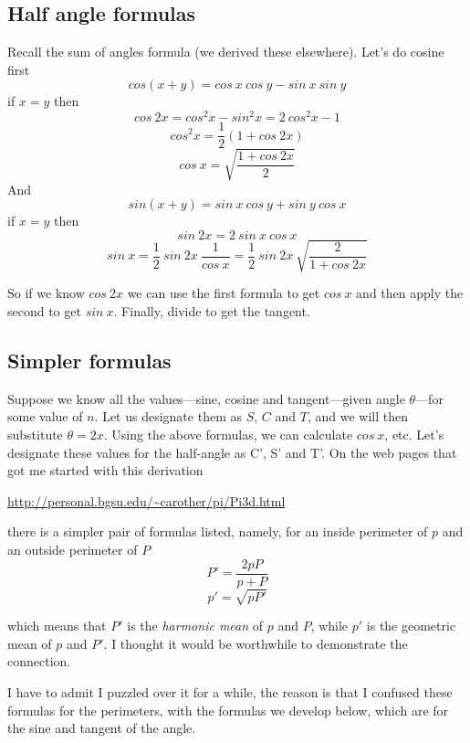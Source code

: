\documentclass[11pt, oneside]{report}   	%
\begin{document}
\subsection*{Half angle formulas}

Recall the sum of angles formula (we derived these elsewhere).  Let's do cosine first
\[ cos(x+y) = cos \ x \ cos \ y -  sin \ x \ sin \ y \]
if $x=y$ then
\[ cos \ 2x = cos^2x - sin^2x = 2 \ cos^2x - 1 \]
\[ cos^2x = \frac{1}{2}(1 + cos\ 2x) \]
\[ cos \ x = \sqrt{\frac{1 + cos\ 2x}{2}}\]
And
\[ sin(x+y) = sin \ x \ cos \ y +  sin \ y \ cos \ x \]
if $x=y$ then
\[ sin \ 2x = 2 \ sin \ x \ cos \ x \]
\[ sin \ x = \frac{1}{2} \ sin \ 2x  \ \frac{1}{cos \ x} =  \frac{1}{2} \ sin\ 2x \ \sqrt{\frac{2}{1+cos\ 2x}}\]

So if we know $cos\ 2x$ we can use the first formula to get $cos \ x$ and then apply the second to get $sin \ x$.  Finally, divide to get the tangent.

\subsection*{Simpler formulas}

Suppose we know all the values---sine, cosine and tangent---given angle $\theta$---for some value of $n$.  Let us designate them as $S$, $C$ and $T$, and we will then substitute $\theta = 2x$.  Using the above formulas, we can calculate $cos \ x$, etc.  Let's designate these values for the half-angle as C', S' and T'.
On the web pages that got me started with this derivation
\vspace{2 mm}

\noindent \url{http://personal.bgsu.edu/~carother/pi/Pi3d.html}
\vspace{2 mm}

\noindent there is a simpler pair of formulas listed, namely, for an inside perimeter of $p$ and an outside perimeter of $P$
\[ P' = \frac{2pP}{p + P} \]
\[ p' = \sqrt{pP'} \]

which means that $P'$ is the \emph{harmonic mean} of $p$ and $P$, while $p'$ is the geometric mean of $p$ and $P'$.  I thought it would be worthwhile to demonstrate the connection.  

I have to admit I puzzled over it for a while, the reason is that I confused these formulas for the perimeters, with the formulas we develop below, which are for the sine and tangent of the angle.
\end{document}

